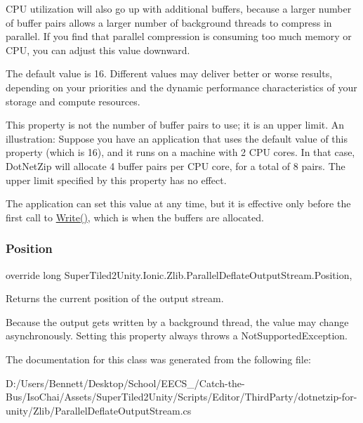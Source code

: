 C\+PU utilization will also go up with additional buffers, because a larger number of buffer pairs allows a larger number of background threads to compress in parallel. If you find that parallel compression is consuming too much memory or C\+PU, you can adjust this value downward. 

The default value is 16. Different values may deliver better or worse results, depending on your priorities and the dynamic performance characteristics of your storage and compute resources. 

This property is not the number of buffer pairs to use; it is an upper limit. An illustration\+: Suppose you have an application that uses the default value of this property (which is 16), and it runs on a machine with 2 C\+PU cores. In that case, Dot\+Net\+Zip will allocate 4 buffer pairs per C\+PU core, for a total of 8 pairs. The upper limit specified by this property has no effect. 

The application can set this value at any time, but it is effective only before the first call to \mbox{\hyperlink{class_super_tiled2_unity_1_1_ionic_1_1_zlib_1_1_parallel_deflate_output_stream_a806d2664ad5782928882e0c1eab34616}{Write()}}, which is when the buffers are allocated. \mbox{\label{class_super_tiled2_unity_1_1_ionic_1_1_zlib_1_1_parallel_deflate_output_stream_a3319643b57f16836e855a048d81f648f}} 
\subsubsection{\texorpdfstring{Position}{Position}}
{\footnotesize\ttfamily override long Super\+Tiled2\+Unity.\+Ionic.\+Zlib.\+Parallel\+Deflate\+Output\+Stream.\+Position\hspace{0.3cm}{\ttfamily [get]}, {\ttfamily [set]}}



Returns the current position of the output stream. 

Because the output gets written by a background thread, the value may change asynchronously. Setting this property always throws a Not\+Supported\+Exception. 

The documentation for this class was generated from the following file\+:\begin{DoxyCompactItemize}
\item 
D\+:/\+Users/\+Bennett/\+Desktop/\+School/\+E\+E\+C\+S\+\_/\+Catch-\/the-\/\+Bus/\+Iso\+Chai/\+Assets/\+Super\+Tiled2\+Unity/\+Scripts/\+Editor/\+Third\+Party/dotnetzip-\/for-\/unity/\+Zlib/Parallel\+Deflate\+Output\+Stream.\+cs\end{DoxyCompactItemize}
